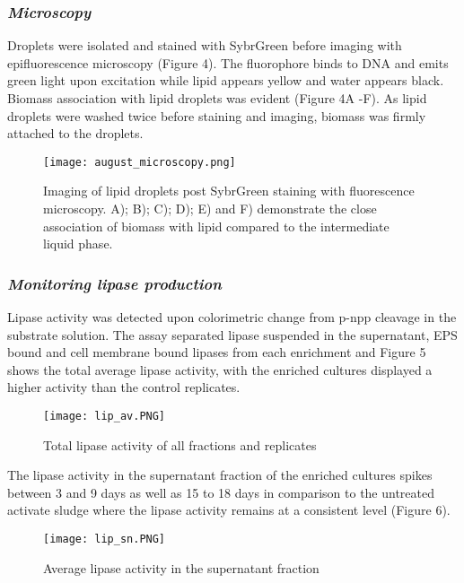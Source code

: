\documentclass{article}
\begin{document}
\subsubsection{\emph{Microscopy}}
 Droplets were isolated and stained with SybrGreen before imaging with epifluorescence microscopy (Figure 4). The fluorophore binds to DNA and emits green light upon excitation while lipid appears yellow and water appears black.
Biomass association with lipid droplets was evident (Figure 4A -F). As lipid droplets were washed twice before staining and imaging, biomass was firmly attached to the droplets.

\begin{figure}
\texttt{[image: august\_microscopy.png]}
\caption{Imaging of lipid droplets post SybrGreen staining with fluorescence microscopy. A); B); C); D); E) and F) demonstrate the close association of biomass with lipid compared to the intermediate liquid phase.}
\end{figure}




\subsubsection{\emph{Monitoring lipase production}}
Lipase activity was detected upon colorimetric change from p-npp cleavage in the substrate solution. The assay separated lipase suspended in the supernatant, EPS bound and cell membrane bound lipases from each enrichment and Figure 5 shows the total average lipase activity, with the enriched cultures displayed a higher activity than the control replicates.
                                                                                                                                                                                                                                         

\begin{figure}
\texttt{[image: lip\_av.PNG]}
\caption{Total lipase activity of all fractions and replicates}
\end{figure}

The lipase activity in the supernatant fraction of the enriched cultures spikes between 3 and 9 days as well as 15 to 18 days in comparison to the untreated activate sludge where the lipase activity remains at a consistent level (Figure 6).

\begin{figure}
\texttt{[image: lip\_sn.PNG]}
\caption{Average lipase activity in the supernatant fraction}
\end{figure}
\end{document}
